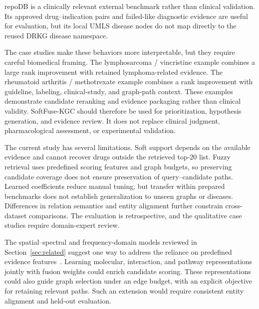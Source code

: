 \documentclass[pdflatex,sn-mathphys-num]{sn-jnl}
\newcommand{\softfuse}{SoftFuse-KGC}
\begin{document}
repoDB is a clinically relevant external benchmark rather than clinical validation. Its approved drug--indication pairs and failed-like diagnostic evidence are useful for evaluation, but its local UMLS disease nodes do not map directly to the reused DRKG disease namespace. 



The case studies make these behaviors more interpretable, but they require careful biomedical framing. The lymphosarcoma / vincristine example combines a large rank improvement with retained lymphoma-related evidence. The rheumatoid arthritis / methotrexate example combines a rank improvement with guideline, labeling, clinical-study, and graph-path context. These examples demonstrate candidate reranking and evidence packaging rather than clinical validity. \softfuse{} should therefore be used for prioritization, hypothesis generation, and evidence review. It does not replace clinical judgment, pharmacological assessment, or experimental validation.


\begin{revisionblock}
The current study has several limitations. Soft support depends on the available evidence and cannot recover drugs outside the retrieved top-20 list. Fuzzy retrieval uses predefined scoring features and graph budgets, so preserving candidate coverage does not ensure preservation of query--candidate paths. Learned coefficients reduce manual tuning, but transfer within prepared benchmarks does not establish generalization to unseen graphs or diseases. Differences in relation semantics and entity alignment further constrain cross-dataset comparisons. The evaluation is retrospective, and the qualitative case studies require domain-expert review.
\end{revisionblock}




\begin{revisionblock}
The spatial--spectral and frequency-domain models reviewed in Section~\ref{sec:related} suggest one way to address the reliance on predefined evidence features~\citep{zhu2026spatialspectral,zhu2026fdmsgl}. Learning molecular, interaction, and pathway representations jointly with fusion weights could enrich candidate scoring. These representations could also guide graph selection under an edge budget, with an explicit objective for retaining relevant paths. Such an extension would require consistent entity alignment and held-out evaluation.
\end{revisionblock}
\end{document}
